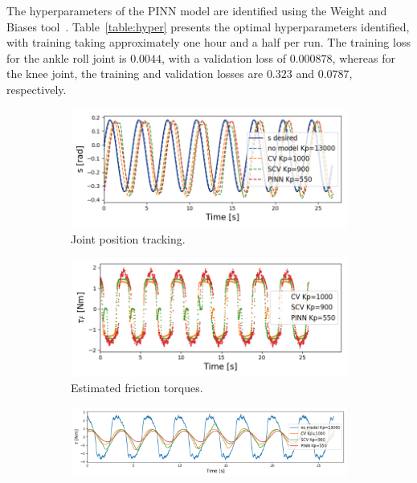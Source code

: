 The hyperparameters of the PINN model are identified using the Weight and Biases tool~\cite{wandb}. Table~\ref{table:hyper} presents the optimal hyperparameters identified, with training taking approximately one hour and a half per run. The training loss for the ankle roll joint is $0.0044$, with a validation loss of $0.000878$, whereas for the knee joint, the training and validation losses are $0.323$ and $0.0787$, respectively.

\begin{figure}[t]
\centering
\begin{subfigure}{.49\textwidth}
  \includegraphics[width=0.98\linewidth,center]{figures/sinusoid_tracking_high_kp.png}
  \vspace{-20pt}
  \caption{Joint position tracking.}
  \label{fig:kptrackingankle}
\end{subfigure}%
\hspace{\fill} %
\begin{subfigure}{.49\textwidth}
  \includegraphics[width=0.98\linewidth,center]{figures/friction_high_kp.png}
  \vspace{-20pt}
  \caption{Estimated friction torques.}
  \label{fig:kpfrictionankle}
\end{subfigure}
\begin{subfigure}{.98\textwidth}
  \includegraphics[width=0.9\linewidth,center]{figures/torque_sinusoid_tracking_high_kp_2.png}

\end{subfigure}
\end{figure}
